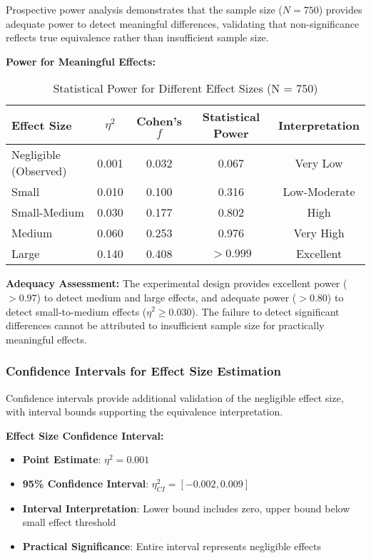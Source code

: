 Prospective power analysis demonstrates that the sample size ($N = 750$) provides adequate power to detect meaningful differences, validating that non-significance reflects true equivalence rather than insufficient sample size.

\textbf{Power for Meaningful Effects:}
\begin{table}[H]
\centering
\caption{Statistical Power for Different Effect Sizes (N = 750)}
\label{tab:power-analysis-effect-sizes}
\begin{tabular}{lcccc}
\toprule
\textbf{Effect Size} & \textbf{$\eta^2$} & \textbf{Cohen's $f$} & \textbf{Statistical Power} & \textbf{Interpretation} \\
\midrule
Negligible (Observed) & 0.001 & 0.032 & 0.067 & Very Low \\
Small & 0.010 & 0.100 & 0.316 & Low-Moderate \\
Small-Medium & 0.030 & 0.177 & 0.802 & High \\
Medium & 0.060 & 0.253 & 0.976 & Very High \\
Large & 0.140 & 0.408 & $> 0.999$ & Excellent \\
\bottomrule
\end{tabular}
\end{table}

\textbf{Adequacy Assessment:}
The experimental design provides excellent power ($> 0.97$) to detect medium and large effects, and adequate power ($> 0.80$) to detect small-to-medium effects ($\eta^2 \geq 0.030$). The failure to detect significant differences cannot be attributed to insufficient sample size for practically meaningful effects.

\subsubsection{Confidence Intervals for Effect Size Estimation}

Confidence intervals provide additional validation of the negligible effect size, with interval bounds supporting the equivalence interpretation.

\textbf{Effect Size Confidence Interval:}
\begin{itemize}
    \item \textbf{Point Estimate}: $\eta^2 = 0.001$
    \item \textbf{95\% Confidence Interval}: $\eta^2_{CI} = [-0.002, 0.009]$
    \item \textbf{Interval Interpretation}: Lower bound includes zero, upper bound below small effect threshold
    \item \textbf{Practical Significance}: Entire interval represents negligible effects
\end{itemize}

